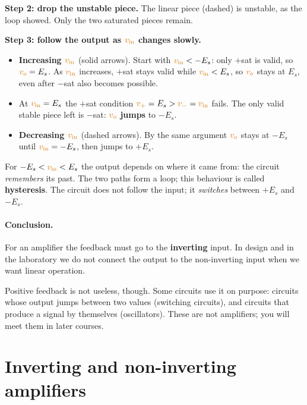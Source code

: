 \documentclass[11pt,a4paper]{article}
\newcommand{\Vcol}[1]{\textcolor{cvolt}{#1}}
\newcommand{\vin}{\Vcol{v_{\mathrm{in}}}}
\newcommand{\vo}{\Vcol{v_o}}
\newcommand{\vp}{\Vcol{v_+}}
\newcommand{\vm}{\Vcol{v_-}}
\newcommand{\Es}{E_s}
\newcommand{\tax}[6]{\draw[vax] (#1,0) -- (#2,0) node[right, font=\small] {#5};
  \draw[vax] (0,#3) -- (0,#4) node[above, font=\small] {#6};}
\newcommand{\xt}[2]{\draw ([yshift=2pt]#1,0) -- ([yshift=-2pt]#1,0) node[below, font=\scriptsize] {#2};}
\newcommand{\xtu}[2]{\draw ([yshift=2pt]#1,0) -- ([yshift=-2pt]#1,0); \node[above, font=\scriptsize] at (#1,0) {#2};}
\newcommand{\pfPlot}[1]{%
  \tax{-4.4}{4.8}{-3.0}{3.3}{$\vin$}{$\vo$}
  \draw[gdash] (2,0) -- (2,2); \draw[gdash] (-2,0) -- (-2,-2);
  \draw[crv] (-4.2,2) -- (2,2); \draw[crv] (-2,-2) -- (4.2,-2);
  \draw[crvu] (-2,-2) -- (2,2);
  \xt{2}{$\Es$} \xtu{-2}{$-\Es$}
  \ifnum#1=0
    \node[reg, above] at (-2.6,2) {$+$sat: $\vin < \Es$};
    \node[reg, below] at (2.6,-2) {$-$sat: $\vin > -\Es$};
    \node[reg, anchor=east] at (-0.3,1.2) {linear};
  \else
    \draw[swup, very thick, -{Stealth[length=2.6mm]}] (-4.0,2.35) -- (-0.6,2.35);
    \draw[swup, very thick, -{Stealth[length=2.6mm]}] (-0.4,2.35) -- (1.9,2.35);
    \draw[swup, very thick, -{Stealth[length=2.6mm]}] (2.3,2.0) -- (2.3,-1.85);
    \draw[swup, very thick, -{Stealth[length=2.6mm]}] (2.3,-2.35) -- (4.1,-2.35);
    \draw[swdn, very thick, densely dashed, -{Stealth[length=2.6mm]}] (4.0,-2.6) -- (0.6,-2.6);
    \draw[swdn, very thick, densely dashed, -{Stealth[length=2.6mm]}] (0.4,-2.6) -- (-1.9,-2.6);
    \draw[swdn, very thick, densely dashed, -{Stealth[length=2.6mm]}] (-2.6,-2.0) -- (-2.6,1.85);
    \draw[swdn, very thick, densely dashed, -{Stealth[length=2.6mm]}] (-2.6,2.6) -- (-4.1,2.6);
    \node[font=\scriptsize, text=swup, anchor=south] at (-3.0,2.8) {$\vin$ increasing};
    \node[font=\scriptsize, text=swdn, anchor=north] at (3.0,-2.8) {$\vin$ decreasing};
  \fi}
\begin{document}
\textbf{Step 2: drop the unstable piece.} The linear piece (dashed) is unstable, as the loop
showed. Only the two saturated pieces remain.

\textbf{Step 3: follow the output as $\vin$ changes slowly.}
\begin{itemize}\itemsep2pt
  \item \textcolor{swup}{\textbf{Increasing $\vin$}} (solid arrows). Start with $\vin < -\Es$:
        only $+$sat is valid, so $\vo = \Es$. As $\vin$ increases, $+$sat stays valid while
        $\vin < \Es$, so $\vo$ stays at $\Es$, even after $-$sat also becomes possible.
  \item At $\vin = \Es$ the $+$sat condition $\vp = \Es > \vm = \vin$ fails. The only valid
        stable piece left is $-$sat: $\vo$ \textbf{jumps} to $-\Es$.
  \item \textcolor{swdn}{\textbf{Decreasing $\vin$}} (dashed arrows). By the same argument $\vo$
        stays at $-\Es$ until $\vin = -\Es$, then jumps to $+\Es$.
\end{itemize}
\begin{center}
\end{center}
For $-\Es < \vin < \Es$ the output depends on where it came from: the circuit \emph{remembers}
its past. The two paths form a loop; this behaviour is called \textbf{hysteresis}. The circuit
does not follow the input; it \emph{switches} between $+\Es$ and $-\Es$.

\paragraph{Conclusion.} For an amplifier the feedback must go to the \textbf{inverting} input. In
design and in the laboratory we do not connect the output to the non-inverting input when we want
linear operation.

Positive feedback is not useless, though. Some circuits use it on purpose: circuits whose output
jumps between two values (switching circuits), and circuits that produce a signal by themselves
(oscillators). These are not amplifiers; you will meet them in later courses.

\section{Inverting and non-inverting amplifiers}
\end{document}

